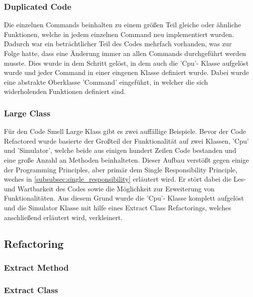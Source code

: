 \documentclass[12pt,a4paper,titlepage,ngerman,pdftex]{report}
\begin{document}
    \subsubsection{Duplicated Code}\label{subsubsec:duplicated_code}

    Die einzelnen Commands beinhalten zu einem größen Teil gleiche oder ähnliche Funktionen, welche in jedem einzelnen Command neu implementiert wurden. Dadurch war ein beträchtlicher Teil des Codes mehrfach vorhanden, was zur Folge hatte,
    dass eine Änderung immer an allen Commands durchgeführt werden musste. Dies wurde in dem Schritt gelöst, in dem auch die 'Cpu'- Klasse aufgelöst wurde und jeder Command in einer eingenen Klasse definiert wurde. 
    Dabei wurde eine abstrakte Oberklasse 'Command' eingeführt, in welcher die sich widerholenden Funktionen definiert sind.

    \subsubsection{Large Class}
    Für den Code Smell Large Klass gibt es zwei auffällige Beispiele. Bevor der Code Refactored wurde basierte der Großteil der Funktionalität auf zwei Klassen, 'Cpu' und 'Simulator', welche beide aus einigen hundert Zeilen Code bestanden und eine große Anzahl an Methoden beinhalteten.
    Dieser Aufbau verstößt gegen einige der Programming Principles, aber primär dem Single Responsibility Principle, weches in \autoref{subsubsec:single_responsibility} erläutert wird. Er stört dabei die Les- und Wartbarkeit des Codes sowie die Möglichkeit zur Erweiterung von Funktionalitäten.
    Aus diesem Grund wurde die 'Cpu'- Klasse komplett aufgelöst und die  Simulator Klasse mit hilfe eines Extract Class Refactorings, welches anschließend erläutert wird, verkleinert.

    \subsection{Refactoring}

    \subsubsection{Extract Method}

    \subsubsection{Extract Class}
\end{document}

